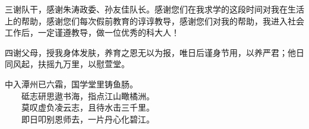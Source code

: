 \begin{ack}
\par 三谢队干，感谢朱涛政委、孙友佳队长。感谢您们在我求学的这段时间对我在生活上的帮助，感谢您们每次假前教育的谆谆教导，感谢您们对我的帮助，我进入社会工作后，一定谨遵教导，做一位优秀的科大人！

\par 四谢父母，授我身体发肤，养育之恩无以为报，唯日后谨身节用，以养严君；他日同风起，扶摇九万里，以慰萱堂。
\par
\begin{center}
    \qquad 中入潭州已六霜，国学堂里铸鱼肠。\\
　　砥志研思遨书海，指点江山瞰橘洲。\\
　　莫叹虚负凌云志，且待水击三千里。\\
　　即日叩别恩师去，一片丹心化碧江。
\end{center}

\end{ack}
